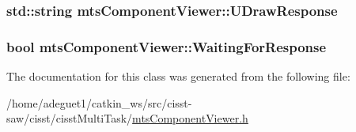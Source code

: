 \hypertarget{classmts_component_viewer_acae080559e0ab6cbb24070743348d9aa}{
\subsubsection[{U\-Draw\-Response}]{\setlength{\rightskip}{0pt plus 5cm}std\-::string mts\-Component\-Viewer\-::\-U\-Draw\-Response\hspace{0.3cm}{\ttfamily [protected]}}}\label{classmts_component_viewer_acae080559e0ab6cbb24070743348d9aa}
\hypertarget{classmts_component_viewer_ad0d7132119ce154a8e7b646153ae0cc0}{
\subsubsection[{Waiting\-For\-Response}]{\setlength{\rightskip}{0pt plus 5cm}bool mts\-Component\-Viewer\-::\-Waiting\-For\-Response\hspace{0.3cm}{\ttfamily [protected]}}}\label{classmts_component_viewer_ad0d7132119ce154a8e7b646153ae0cc0}


The documentation for this class was generated from the following file\-:\begin{DoxyCompactItemize}
\item 
/home/adeguet1/catkin\-\_\-ws/src/cisst-\/saw/cisst/cisst\-Multi\-Task/\hyperlink{mts_component_viewer_8h}{mts\-Component\-Viewer.\-h}\end{DoxyCompactItemize}

